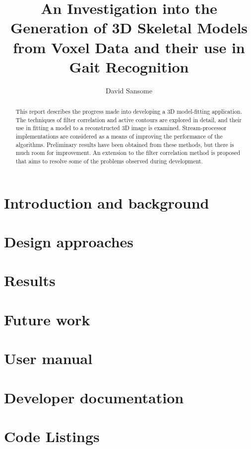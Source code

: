 \documentclass[a4paper,12pt]{report}
\title{An Investigation into the Generation of 3D Skeletal Models from Voxel Data and their use in Gait Recognition}
\author{David Sansome}
\begin{document}


\maketitle

\begin{abstract}
	This report describes the progress made into developing a 3D model-fitting application.
	The techniques of filter correlation and active contours are explored in detail, and their use in fitting a model to a reconstructed 3D image is examined.
	Stream-processor implementations are considered as a means of improving the performance of the algorithms.
	Preliminary results have been obtained from these methods, but there is much room for improvement.
	An extension to the filter correlation method is proposed that aims to resolve some of the problems observed during development.
\end{abstract}

\newpage

\tableofcontents

\chapter{Introduction and background}

\clearpage
\clearpage


\chapter{Design approaches}

\clearpage
\clearpage
\clearpage
\clearpage
\clearpage


\chapter{Results}

\clearpage
\clearpage


\chapter{Future work}



\newpage


\newpage
\appendix

\chapter{User manual}


\chapter{Developer documentation}


\chapter{Code Listings}

\end{document}
